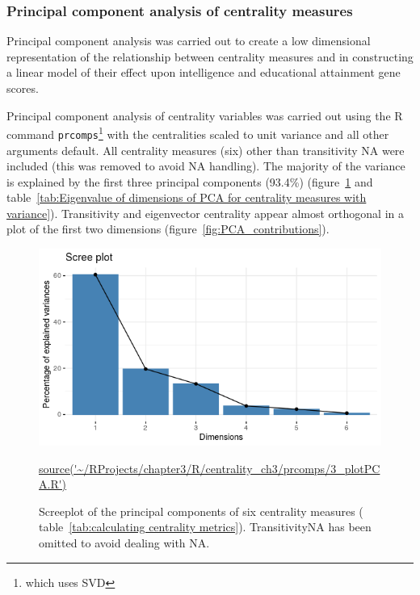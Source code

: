 \subsubsection{Principal component analysis of centrality measures}

Principal component analysis was carried out to create a low dimensional representation of the relationship between centrality measures and in constructing a linear model of their effect upon intelligence and educational attainment gene scores. 

Principal component analysis of centrality variables was carried out using the R command \texttt{prcomps}\footnote{which uses SVD} with the centralities scaled to unit variance and all other arguments default. All centrality measures (six) other than transitivity NA were included (this was removed to avoid NA handling). The majority of the variance is explained by the first three principal components (93.4\%) (figure~\ref{fig:PCA_scree} and table~\ref{tab:Eigenvalue of dimensions of PCA for centrality measures with variance}). Transitivity and eigenvector centrality appear almost orthogonal in a plot of the first two dimensions (figure~\ref{fig:PCA_contributions}).





\begin{figure}
    \centering
    \includegraphics[width=\textwidth]{images/chapter3/centrality_pca_factoextra/Rplot_screeplot.png}
    \caption{Screeplot of the principal components of six centrality measures ( table~\ref{tab:calculating centrality metrics}). TransitivityNA has been omitted to avoid dealing with NA.} \tiny\url{source('~/RProjects/chapter3/R/centrality_ch3/prcomps/3_plotPCA.R')}
    \label{fig:PCA_scree}
\end{figure}

